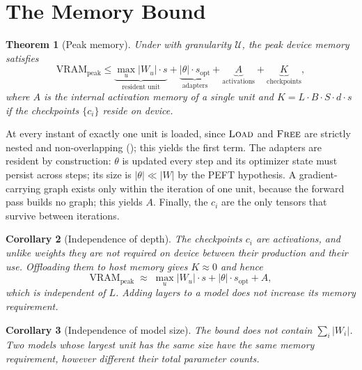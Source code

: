\documentclass[journal]{IEEEtran}
\newtheorem{theorem}{Theorem}
\newtheorem{corollary}[theorem]{Corollary}
\newcommand{\Wu}{\lvert W_u \rvert}
\begin{document}
\section{The Memory Bound}
\label{sec:vram}

\begin{theorem}[Peak memory]
\label{thm:vram}
Under  with granularity $\mathcal{U}$, the peak device memory satisfies
\begin{equation}
\label{eq:vram}
\mathrm{VRAM}_{\text{peak}} \le \underbrace{\max_u \Wu \cdot s}_{\text{resident unit}}
+ \underbrace{|\theta|\cdot s_{\text{opt}}}_{\text{adapters}}
+ \underbrace{A}_{\text{activations}}
+ \underbrace{K}_{\text{checkpoints}},
\end{equation}
where $A$ is the internal activation memory of a \emph{single} unit and
$K = L\cdot B\cdot S\cdot d\cdot s$ if the checkpoints $\{c_i\}$ reside on device.
\end{theorem}

\begin{IEEEproof}
At every instant of  exactly one unit is loaded, since $\textsc{Load}$ and
$\textsc{Free}$ are strictly nested and non-overlapping (); this yields the first
term. The adapters are resident by construction: $\theta$ is updated every step and its optimizer
state must persist across steps; its size is $|\theta| \ll |W|$ by the PEFT hypothesis. A
gradient-carrying graph exists only within the iteration of one unit, because the forward pass
builds no graph; this yields $A$. Finally, the $c_i$ are the only tensors that survive between
iterations.
\end{IEEEproof}

\begin{corollary}[Independence of depth]
\label{cor:depth}
The checkpoints $c_i$ are activations, and unlike weights they are not required on device between
their production and their use. Offloading them to host memory gives $K \approx 0$ and hence
\begin{equation}
\mathrm{VRAM}_{\text{peak}} \;\approx\; \max_u \Wu \cdot s + |\theta| \cdot s_{\text{opt}} + A ,
\end{equation}
which is independent of $L$. Adding layers to a model does not increase its memory requirement.
\end{corollary}

\begin{corollary}[Independence of model size]
\label{cor:size}
The bound does not contain $\sum_i |W_i|$. Two models whose largest unit has the same size have
the same memory requirement, however different their total parameter counts.
\end{corollary}
\end{document}
